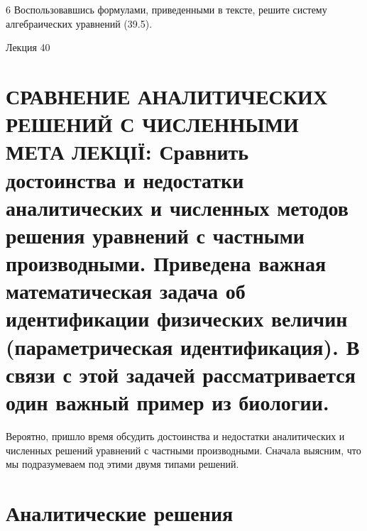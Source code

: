 \documentclass[
  ukrainian,
]{article}
\begin{document}
6 Воспользовавшись формулами, приведенными в тексте, решите систему
алгебраических уравнений (39.5).

Лекция 40

\section{СРАВНЕНИЕ АНАЛИТИЧЕСКИХ РЕШЕНИЙ С ЧИСЛЕННЫМИ МЕТА ЛЕКЦІЇ:
Сравнить достоинства и недостатки аналитических и численных методов
решения уравнений с частными производными. Приведена важная
математическая задача об идентификации физических величин
(параметрическая идентификация). В связи с этой задачей рассматривается
один важный пример из
биологии.}\label{ux441ux440ux430ux432ux43dux435ux43dux438ux435-ux430ux43dux430ux43bux438ux442ux438ux447ux435ux441ux43aux438ux445-ux440ux435ux448ux435ux43dux438ux439-ux441-ux447ux438ux441ux43bux435ux43dux43dux44bux43cux438-ux43cux435ux442ux430-ux43bux435ux43aux446ux456ux457-ux441ux440ux430ux432ux43dux438ux442ux44c-ux434ux43eux441ux442ux43eux438ux43dux441ux442ux432ux430-ux438-ux43dux435ux434ux43eux441ux442ux430ux442ux43aux438-ux430ux43dux430ux43bux438ux442ux438ux447ux435ux441ux43aux438ux445-ux438-ux447ux438ux441ux43bux435ux43dux43dux44bux445-ux43cux435ux442ux43eux434ux43eux432-ux440ux435ux448ux435ux43dux438ux44f-ux443ux440ux430ux432ux43dux435ux43dux438ux439-ux441-ux447ux430ux441ux442ux43dux44bux43cux438-ux43fux440ux43eux438ux437ux432ux43eux434ux43dux44bux43cux438.-ux43fux440ux438ux432ux435ux434ux435ux43dux430-ux432ux430ux436ux43dux430ux44f-ux43cux430ux442ux435ux43cux430ux442ux438ux447ux435ux441ux43aux430ux44f-ux437ux430ux434ux430ux447ux430-ux43eux431-ux438ux434ux435ux43dux442ux438ux444ux438ux43aux430ux446ux438ux438-ux444ux438ux437ux438ux447ux435ux441ux43aux438ux445-ux432ux435ux43bux438ux447ux438ux43d-ux43fux430ux440ux430ux43cux435ux442ux440ux438ux447ux435ux441ux43aux430ux44f-ux438ux434ux435ux43dux442ux438ux444ux438ux43aux430ux446ux438ux44f.-ux432-ux441ux432ux44fux437ux438-ux441-ux44dux442ux43eux439-ux437ux430ux434ux430ux447ux435ux439-ux440ux430ux441ux441ux43cux430ux442ux440ux438ux432ux430ux435ux442ux441ux44f-ux43eux434ux438ux43d-ux432ux430ux436ux43dux44bux439-ux43fux440ux438ux43cux435ux440-ux438ux437-ux431ux438ux43eux43bux43eux433ux438ux438.}

Вероятно, пришло время обсудить достоинства и недостатки аналитических и
численных решений уравнений с частными производными. Сначала выясним,
что мы подразумеваем под этими двумя типами решений.

\section{Аналитические
решения}\label{ux430ux43dux430ux43bux438ux442ux438ux447ux435ux441ux43aux438ux435-ux440ux435ux448ux435ux43dux438ux44f}
\end{document}
